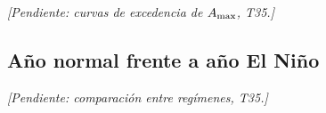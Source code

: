 \textit{[Pendiente: curvas de excedencia de $A_{\max}$, T35.]}

\subsection{Año normal frente a año El Niño}

\textit{[Pendiente: comparación entre regímenes, T35.]}
